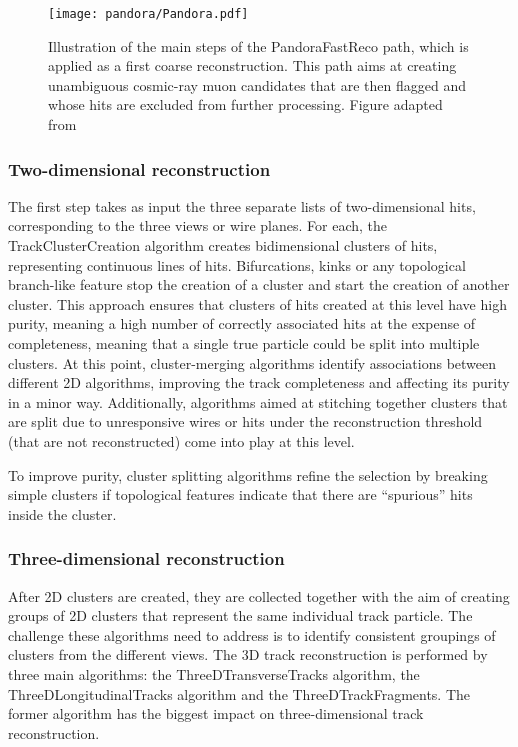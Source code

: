 \begin{figure}
    \centering
    \texttt{[image: pandora/Pandora.pdf]}
    \caption[PandoraFastReco path illustration]{Illustration of the main steps of the PandoraFastReco path, which is applied as a first coarse reconstruction. This path aims at creating unambiguous cosmic-ray muon candidates that are then flagged and whose hits are excluded from further processing. Figure adapted from \cite{MicroBooNE:2017xvs}}
    \label{fig:PandoraFastReco}
\end{figure}

\subsubsection{Two-dimensional reconstruction}

The first step takes as input the three separate lists of two-dimensional hits, corresponding to the three views or wire planes. For each, the TrackClusterCreation algorithm creates bidimensional clusters of hits, representing continuous lines of hits. Bifurcations, kinks or any topological branch-like feature stop the creation of a cluster and start the creation of another cluster. This approach ensures that clusters of hits created at this level have high purity, meaning a high number of correctly associated hits at the expense of completeness, meaning that a single true particle could be split into multiple clusters. At this point, cluster-merging algorithms identify associations between different 2D algorithms, improving the track completeness and affecting its purity in a minor way. Additionally, algorithms aimed at stitching together clusters that are split due to unresponsive wires or hits under the reconstruction threshold (that are not reconstructed) come into play at this level. 

To improve purity, cluster splitting algorithms refine the selection by breaking simple clusters if topological features indicate that there are ``spurious'' hits inside the cluster. 

\subsubsection{Three-dimensional reconstruction}

After 2D clusters are created, they are collected together with the aim of creating groups of 2D clusters that represent the same individual track particle. The challenge these algorithms need to address is to identify consistent groupings of clusters from the different views. The 3D track reconstruction is performed by three main algorithms: the ThreeDTransverseTracks algorithm, the ThreeDLongitudinalTracks algorithm and the ThreeDTrackFragments. The former algorithm has the biggest impact on three-dimensional track reconstruction.

